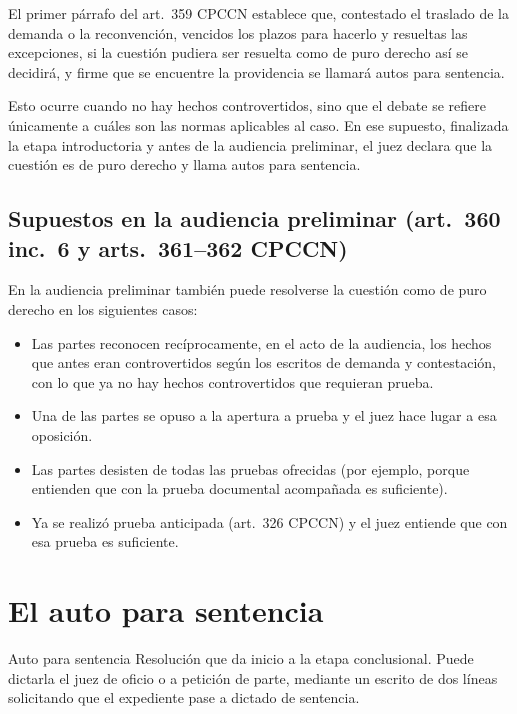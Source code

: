 \documentclass[12pt,oneside]{book}
\begin{document}
El primer párrafo del art.~359 CPCCN establece que, contestado el traslado de la demanda o la reconvención, vencidos los plazos para hacerlo y resueltas las excepciones, si la cuestión pudiera ser resuelta como de puro derecho así se decidirá, y firme que se encuentre la providencia se llamará autos para sentencia.

Esto ocurre cuando no hay hechos controvertidos, sino que el debate se refiere únicamente a cuáles son las normas aplicables al caso. En ese supuesto, finalizada la etapa introductoria y antes de la audiencia preliminar, el juez declara que la cuestión es de puro derecho y llama autos para sentencia.

\subsection{Supuestos en la audiencia preliminar (art.~360 inc.~6 y arts.~361--362 CPCCN)}

En la audiencia preliminar también puede resolverse la cuestión como de puro derecho en los siguientes casos:

\begin{itemize}
    \item Las partes reconocen recíprocamente, en el acto de la audiencia, los hechos que antes eran controvertidos según los escritos de demanda y contestación, con lo que ya no hay hechos controvertidos que requieran prueba.
    \item Una de las partes se opuso a la apertura a prueba y el juez hace lugar a esa oposición.
    \item Las partes desisten de todas las pruebas ofrecidas (por ejemplo, porque entienden que con la prueba documental acompañada es suficiente).
    \item Ya se realizó prueba anticipada (art.~326 CPCCN) y el juez entiende que con esa prueba es suficiente.
\end{itemize}

\section{El auto para sentencia}

\begin{definition}{Auto para sentencia}
Resolución que da inicio a la etapa conclusional. Puede dictarla el juez de oficio o a petición de parte, mediante un escrito de dos líneas solicitando que el expediente pase a dictado de sentencia.
\end{definition}
\end{document}

